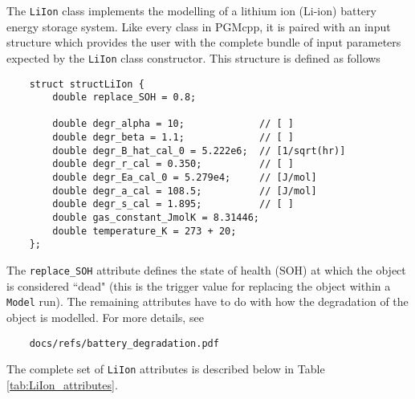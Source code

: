 \documentclass[12pt, letterpaper]{report}
\begin{document}
The \texttt{LiIon} class implements the modelling of a lithium ion (Li-ion) battery energy storage system. Like every class in PGMcpp, it is paired with an input structure which provides the user with the complete bundle of input parameters expected by the \texttt{LiIon} class constructor. This structure is defined as follows

\begin{verbatim}
    struct structLiIon {
        double replace_SOH = 0.8;
        
        double degr_alpha = 10;             // [ ]
        double degr_beta = 1.1;             // [ ]
        double degr_B_hat_cal_0 = 5.222e6;  // [1/sqrt(hr)]
        double degr_r_cal = 0.350;          // [ ]
        double degr_Ea_cal_0 = 5.279e4;     // [J/mol]
        double degr_a_cal = 108.5;          // [J/mol]
        double degr_s_cal = 1.895;          // [ ]
        double gas_constant_JmolK = 8.31446;
        double temperature_K = 273 + 20;    
    };
\end{verbatim}

\noindent The \texttt{replace\_SOH} attribute defines the state of health (SOH) at which the object is considered ``dead" (this is the trigger value for replacing the object within a \texttt{Model} run). The remaining attributes have to do with how the degradation of the object is modelled. For more details, see

\begin{verbatim}
    docs/refs/battery_degradation.pdf
\end{verbatim}

The complete set of \texttt{LiIon} attributes is described below in Table \ref{tab:LiIon_attributes}.

\begin{table}[H]
    \centering
    \caption{\texttt{LiIon} attribute descriptions}
    \label{tab:LiIon_attributes}
\end{table}
\end{document}
